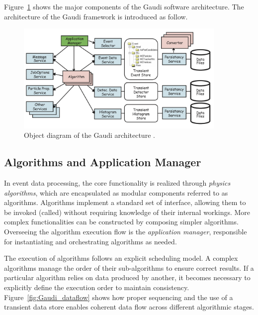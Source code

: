 Figure~\ref{fig:Gaudi_object_diagram} shows the major components of the Gaudi software architecture. The architecture of the Gaudi framework is introduced as follow.

\begin{figure}[htbp]
  \centering
  \includegraphics[width=0.9\textwidth]{figs/chapter3/Gaudi_object_diagram.png}
  \caption{Object diagram of the Gaudi architecture \cite{Gaudi}.}
  \label{fig:Gaudi_object_diagram}
\end{figure}

\subsection{Algorithms and Application Manager}
In event data processing, the core functionality is realized through \textit{physics algorithms}, which are encapsulated as modular components referred to as algorithms. Algorithms implement a standard set of interface, allowing them to be invoked (called) without requiring knowledge of their internal workings. More complex functionalities can be constructed by composing simpler algorithms. Overseeing the algorithm execution flow is the \textit{application manager}, responsible for instantiating and orchestrating algorithms as needed.

The execution of algorithms follows an explicit scheduling model. A complex algorithms manage the order of their sub-algorithms to ensure correct results. If a particular algorithm relies on data produced by another, it becomes necessary to explicitly define the execution order to maintain consistency. Figure~\ref{fig:Gaudi_dataflow} shows how proper sequencing and the use of a transient data store enables coherent data flow across different algorithmic stages.

